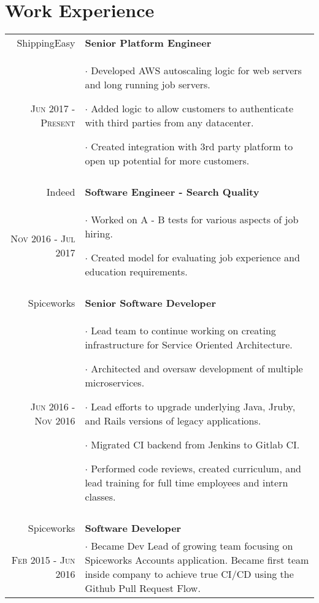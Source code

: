 \documentclass[a4paper,10pt]{article}
\begin{document}
\section{Work Experience}
\begin{tabular}{r|p{11cm}}
 ShippingEasy & \textbf{Senior Platform Engineer} \\
 \textsc{Jun 2017 - Present} &
	\footnotesize{
		$\cdot$ Developed AWS autoscaling logic for web servers and long running job servers.

		$\cdot$ Added logic to allow customers to authenticate with third parties from any datacenter.

		$\cdot$ Created integration with 3rd party platform to open up potential for more customers.
	}
	\\\multicolumn{2}{c}{} \\

	Indeed & \textbf{Software Engineer - Search Quality} \\
	\textsc{Nov 2016 - Jul 2017} &
	 \footnotesize{
		 $\cdot$ Worked on A - B tests for various aspects of job hiring.

		 $\cdot$ Created model for evaluating job experience and education requirements.
	 }
	 \\\multicolumn{2}{c}{} \\

	 Spiceworks & \textbf{Senior Software Developer} \\
	 \textsc{Jun 2016 - Nov 2016} &
		\footnotesize{
			$\cdot$ Lead team to continue working on creating infrastructure for Service Oriented Architecture.

			$\cdot$ Architected and oversaw development of multiple microservices.

			$\cdot$ Lead efforts to upgrade underlying Java, Jruby, and Rails versions of legacy applications.

			$\cdot$ Migrated CI backend from Jenkins to Gitlab CI.

			$\cdot$ Performed code reviews, created curriculum, and lead training for full time employees and intern classes.
		}
		\\\multicolumn{2}{c}{} \\

	Spiceworks & \textbf{Software Developer} \\
	\textsc{Feb 2015 - Jun 2016} &
	 \footnotesize{

		 $\cdot$ Became Dev Lead of growing team focusing on Spiceworks Accounts application. Became first team inside company to achieve true CI/CD using the Github Pull Request Flow.

}
\end{tabular}
\end{document}
